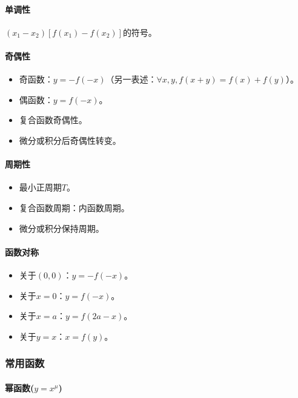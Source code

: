\documentclass[
12pt, %
a4paper, 
oneside, %
headinclude,footinclude, %
]{scrartcl}
\begin{document}
\paragraph{单调性}
$ (x_1 - x_2)[f(x_1) - f(x_2)] $的符号。
\paragraph{奇偶性}
\begin{itemize}
\item 奇函数：$ y = -f(-x) $（另一表述：$ \forall x,y, f(x + y) = f(x) + f(y) $）。
\item 偶函数：$ y = f(-x) $。
\item 复合函数奇偶性。
\item 微分或积分后奇偶性转变。
\end{itemize}
\paragraph{周期性}
\begin{itemize}
\item 最小正周期$ T $。
\item 复合函数周期：内函数周期。
\item 微分或积分保持周期。
\end{itemize}
\paragraph{函数对称}
\begin{itemize}
\item 关于$ (0, 0) $：$ y = -f(-x) $。
\item 关于$ x = 0 $：$ y = f(-x) $。
\item 关于$ x = a $：$ y = f(2a - x) $。
\item 关于$ y = x $：$ x = f(y) $。
\end{itemize}
\subsubsection[常用函数]{常用函数}
\paragraph{幂函数($ y = x^\mu $)}
\end{document}
